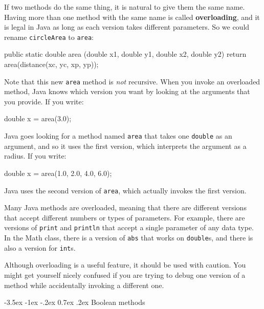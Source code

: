 \documentclass[12pt]{book}
\makeatletter
\theoremstyle{exercise}
\newcommand{\java}[1]{\verb"#1"}
\renewcommand{\section}{\@startsection{section}{1}{\z@}%
    {-3.5ex \@plus -1ex \@minus -.2ex}%
    {0.7ex \@plus.2ex}%
    {\normalfont\Large\bfseries}}
\newcommand{\java}[1]{\lstinline{#1}} %
\makeatother
\begin{document}

If two methods do the same thing, it is natural to give them the same name.
Having more than one method with the same name is called {\bf overloading}, and it is legal in Java as long as each version takes different parameters.
So we could rename \java{circleArea} to \java{area}:

\begin{code}
    public static double area
            (double x1, double y1, double x2, double y2) {
        return area(distance(xc, yc, xp, yp));
    }
\end{code}

Note that this new \java{area} method is {\em not} recursive.
When you invoke an overloaded method, Java knows which version you want by looking at the arguments that you provide.
If you write:

\begin{code}
    double x = area(3.0);
\end{code}

Java goes looking for a method named \java{area} that takes one \java{double} as an argument, and so it uses the first version, which interprets the argument as a radius.
If you write:

\begin{code}
    double x = area(1.0, 2.0, 4.0, 6.0);
\end{code}

Java uses the second version of \java{area}, which actually invokes the first version.

Many Java methods are overloaded, meaning that there are different versions that accept different numbers or types of parameters.
For example, there are versions of \java{print} and \java{println} that accept a single parameter of any data type.
In the Math class, there is a version of \java{abs} that works on \java{double}s, and there is also a version for \java{int}s.

Although overloading is a useful feature, it should be used with caution.
You might get yourself nicely confused if you are trying to debug one version of a method while accidentally invoking a different one.


\section{Boolean methods}
\label{boolean}

\end{document}
